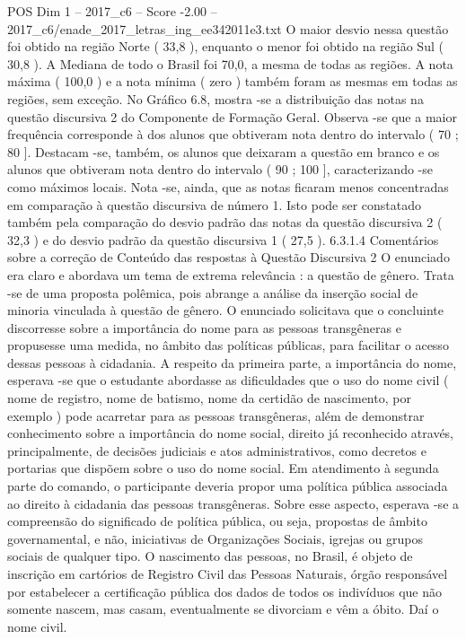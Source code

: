 \begin{textsample}{POS Dim 1 – 2017\_c6 – Score -2.00 – 2017\_c6/enade\_2017\_letras\_ing\_ee342011e3.txt}
O maior desvio nessa questão foi obtido na região Norte ( 33,8 ), enquanto o menor foi obtido na região Sul ( 30,8 ).
A Mediana de todo o Brasil foi 70,0, a mesma de todas as regiões.
A nota máxima ( 100,0 ) e a nota mínima ( zero ) também foram as mesmas em todas as regiões, sem exceção.
No Gráfico 6.8, mostra -se a distribuição das notas na questão discursiva 2 do Componente de Formação Geral.
Observa -se que a maior frequência corresponde à dos alunos que obtiveram nota dentro do intervalo ( 70 ; 80 ].
Destacam -se, também, os alunos que deixaram a questão em branco e os alunos que obtiveram nota dentro do intervalo ( 90 ; 100 ], caracterizando -se como máximos locais.
Nota -se, ainda, que as notas ficaram menos concentradas em comparação à questão discursiva de número 1.
Isto pode ser constatado também pela comparação do desvio padrão das notas da questão discursiva 2 ( 32,3 ) e do desvio padrão da questão discursiva 1 ( 27,5 ). 6.3.1.4 Comentários sobre a correção de Conteúdo das respostas à Questão Discursiva 2 O enunciado era claro e abordava um tema de extrema relevância : a questão de gênero.
Trata -se de uma proposta polêmica, pois abrange a análise da inserção social de minoria vinculada à questão de gênero.
O enunciado solicitava que o concluinte discorresse sobre a importância do nome para as pessoas transgêneras e propusesse uma medida, no âmbito das políticas públicas, para facilitar o acesso dessas pessoas à cidadania.
A respeito da primeira parte, a importância do nome, esperava -se que o estudante abordasse as dificuldades que o uso do nome civil ( nome de registro, nome de batismo, nome da certidão de nascimento, por exemplo ) pode acarretar para as pessoas transgêneras, além de demonstrar conhecimento sobre a importância do nome social, direito já reconhecido através, principalmente, de decisões judiciais e atos administrativos, como decretos e portarias que dispõem sobre o uso do nome social.
Em atendimento à segunda parte do comando, o participante deveria propor uma política pública associada ao direito à cidadania das pessoas transgêneras.
Sobre esse aspecto, esperava -se a compreensão do significado de política pública, ou seja, propostas de âmbito governamental, e não, iniciativas de Organizações Sociais, igrejas ou grupos sociais de qualquer tipo.
O nascimento das pessoas, no Brasil, é objeto de inscrição em cartórios de Registro Civil das Pessoas Naturais, órgão responsável por estabelecer a certificação pública dos dados de todos os indivíduos que não somente nascem, mas casam, eventualmente se divorciam e vêm a óbito.
Daí o nome civil.

\end{textsample}
